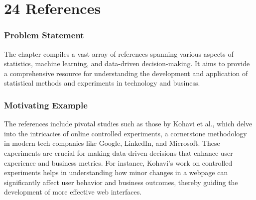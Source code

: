 \documentclass{article}
\begin{document}
\section*{24 References}
\subsubsection*{Problem Statement}
The chapter compiles a vast array of references spanning various aspects of statistics, machine learning, and data-driven decision-making. It aims to provide a comprehensive resource for understanding the development and application of statistical methods and experiments in technology and business.

\subsubsection*{Motivating Example}
The references include pivotal studies such as those by Kohavi et al., which delve into the intricacies of online controlled experiments, a cornerstone methodology in modern tech companies like Google, LinkedIn, and Microsoft. These experiments are crucial for making data-driven decisions that enhance user experience and business metrics. For instance, Kohavi's work on controlled experiments helps in understanding how minor changes in a webpage can significantly affect user behavior and business outcomes, thereby guiding the development of more effective web interfaces.
\end{document}
